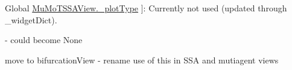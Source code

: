 \begin{DoxyRefList}
Global \hyperlink{class_mu_mo_t_1_1_mu_mo_t_s_s_a_view_a5feff4ca83ee97d6e09874496a4975d4}{Mu\+Mo\+T\+S\+S\+A\+View.\+\_\+plot\+Type} ]\+: Currently not used (updated through \+\_\+widget\+Dict). 
\item[\label{todo__todo000021}%
\Hypertarget{todo__todo000021}%
Global \hyperlink{class_mu_mo_t_1_1_mu_mo_tview_a15f56ca9811d1e67d721fa64f9b0dc1e}{Mu\+Mo\+Tview.\+\_\+controller} ]-\/ could become None  
\item[\label{todo__todo000022}%
\Hypertarget{todo__todo000022}%
Global \hyperlink{class_mu_mo_t_1_1_mu_mo_tview_a5feff4ca83ee97d6e09874496a4975d4}{Mu\+Mo\+Tview.\+\_\+plot\+Type} ]move to bifurcation\+View -\/ rename use of this in S\+SA and mutiagent views 
\end{DoxyRefList}
